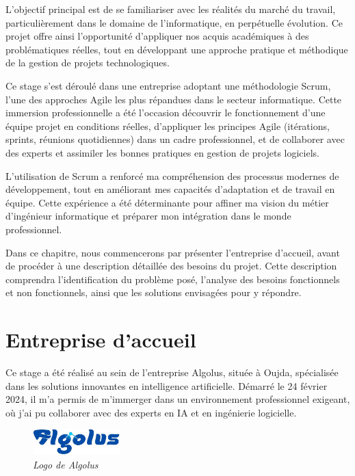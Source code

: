 \documentclass[12pt,a4paper]{report}
\begin{document}
	L’objectif principal est de se familiariser avec les réalités du marché du travail, particulièrement dans le domaine de l’informatique, en perpétuelle évolution. Ce projet offre ainsi l’opportunité d’appliquer nos acquis académiques à des problématiques réelles, tout en développant une approche pratique et méthodique de la gestion de projets technologiques.
	
	Ce stage s’est déroulé dans une entreprise adoptant une méthodologie Scrum, l’une des approches Agile les plus répandues dans le secteur informatique. Cette immersion professionnelle a été l’occasion découvrir le fonctionnement d’une équipe projet en conditions réelles, d'appliquer les principes Agile (itérations, sprints, réunions quotidiennes) dans un cadre professionnel, et de collaborer avec des experts et assimiler les bonnes pratiques en gestion de projets logiciels.
	
	L’utilisation de Scrum a renforcé ma compréhension des processus modernes de développement, tout en améliorant mes capacités d’adaptation et de travail en équipe. Cette expérience a été déterminante pour affiner ma vision du métier d’ingénieur informatique et préparer mon intégration dans le monde professionnel.
	
	Dans ce chapitre, nous commencerons par présenter l’entreprise d’accueil, avant de procéder à une description détaillée des besoins du projet. Cette description comprendra l’identification du problème posé, l’analyse des besoins fonctionnels et non fonctionnels, ainsi que les solutions envisagées pour y répondre.
	
	\section{Entreprise d’accueil}
	
	Ce stage a été réalisé au sein de l’entreprise Algolus, située à Oujda, spécialisée dans les solutions innovantes en intelligence artificielle. Démarré le 24 février 2024, il m’a permis de m’immerger dans un environnement professionnel exigeant, où j’ai pu collaborer avec des experts en IA et en ingénierie logicielle.
	
	\begin{figure}[H]
		\centering
		\includegraphics[width=0.3\textwidth]{algolus-logo.png}
		\caption{\textit{Logo de Algolus}}
		\label{fig:algolus-logo}
	\end{figure}
	
\end{document}

